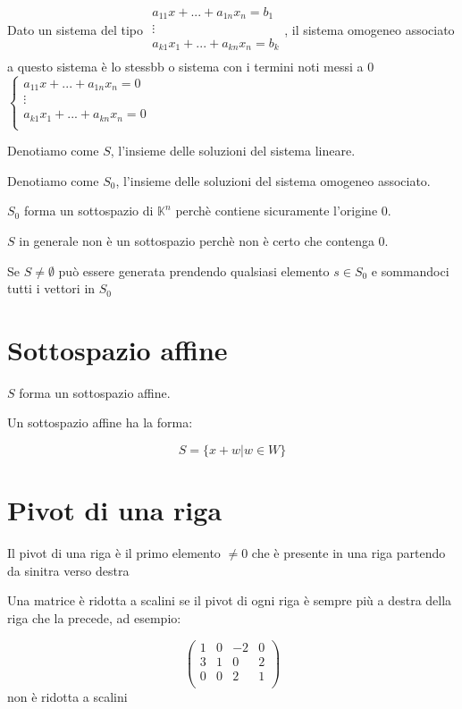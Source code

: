 \documentclass[a4paper, 10pt]{article}
\begin{document}
Dato un sistema del tipo $ \begin{matrix}a_{11}x+...+a_{1n}x_n=b_1\\\vdots\\a_{k1}x_1+...+a_{kn}x_n=b_k\\\end{matrix} $, il sistema omogeneo associato a questo sistema è lo stessbb o sistema con i termini noti messi a 0 $\left\{\begin{matrix}a_{11}x+...+a_{1n}x_n=0\\\vdots\\a_{k1}x_1+...+a_{kn}x_n=0\\\end{matrix}\right.$

Denotiamo come $S$, l'insieme delle soluzioni del sistema lineare.

Denotiamo come $S_0$, l'insieme delle soluzioni del sistema omogeneo associato.

$S_0$ forma un sottospazio di $\mathbb{K}^n$ perchè contiene sicuramente l'origine $0$.

$S$ in generale non è un sottospazio perchè non è certo che contenga 0.

Se $S \neq \emptyset$ può essere generata prendendo qualsiasi elemento $s \in S_0$ e sommandoci tutti i vettori in $S_0$

\section{Sottospazio affine}

$S$ forma un sottospazio affine.

Un sottospazio affine ha la forma:

$$S=\{x+w|w \in W\}$$

\section{Pivot di una riga}
Il pivot di una riga è il primo elemento $\neq 0$ che è presente in una riga partendo da sinitra verso destra

Una matrice è ridotta a scalini se il pivot di ogni riga è sempre più a destra della riga che la precede, ad esempio:

$$\left(\begin{matrix}1&0&-2&0\\3&1&0&2\\0&0&2&1\\\end{matrix}\right) $$ non è ridotta a scalini
\end{document}
